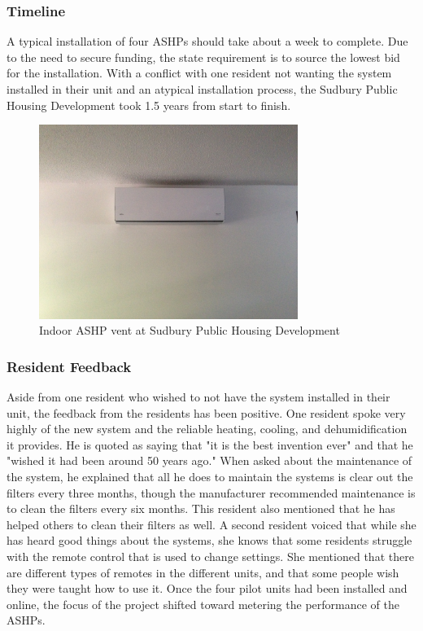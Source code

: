 \subsubsection{Timeline}
\par A typical installation of four ASHPs should take about a week to complete. Due to the need to secure funding, the state requirement is to source the lowest bid for the installation. With a conflict with one resident not wanting the system installed in their unit and an atypical installation process, the Sudbury Public Housing Development took 1.5 years from start to finish.
\begin{figure}[H]
\centering
\includegraphics[width=0.75\textwidth]{findingschapter/sudburyinsideunit}
\caption{Indoor ASHP vent at Sudbury Public Housing Development}
\label{fig:sudburyvents}
\end{figure}

\subsubsection{Resident Feedback}
\par Aside from one resident who wished to not have the system installed in their unit, the feedback from the residents has been positive. One resident spoke very highly of the new system and the reliable heating, cooling, and dehumidification it provides. He is quoted as saying that "it is the best invention ever" and that he "wished it had been around 50 years ago." When asked about the maintenance of the system, he explained that all he does to maintain the systems is clear out the filters every three months, though the manufacturer recommended maintenance is to clean the filters every six months. This resident also mentioned that he has helped others to clean their filters as well. A second resident voiced that while she has heard good things about the systems, she knows that some residents struggle with the remote control that is used to change settings. She mentioned that there are different types of remotes in the different units, and that some people wish they were taught how to use it. Once the four pilot units had been installed and online, the focus of the project shifted toward metering the performance of the ASHPs.

